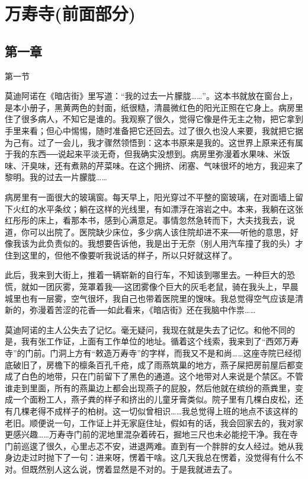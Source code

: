 \chapter{万寿寺(前面部分)}

\section{第一章}

第一节 

莫迪阿诺在《暗店街》里写道：“我的过去一片朦胧……”。这本书就放在窗台上，是本小册子，黑黄两色的封面，纸很糙，清晨微红色的阳光正照在它身上。病房里住了很多病人，不知它是谁的。我观察了很久，觉得它像是件无主之物，把它拿到手里来看；但心中惕惕，随时准备把它还回去。过了很久也没人来要，我就把它据为己有。过了一会儿，我才骤然领悟到：这本书原来是我的。这世界上原来还有属于我的东西──说起来平淡无奇，但我确实没想到。病房里弥漫着水果味、米饭味、汗臭味，还有煮熟的芹菜味。在这个拥挤、闭塞、气味很坏的地方，我迎来了黎明。我的过去一片朦胧…… 

病房里有一面很大的玻璃窗。每天早上，阳光穿过不平整的窗玻璃，在对面墙上留下火红的水平条纹；躺在这样的光线里，有如漂浮在溶岩之中。本来，我躺在这张红彤彤的床上，看那本书，感到心满意足。事情忽然急转而下，大夫找我去，说道，你可以出院了。医院缺少床位，多少病人该住院却进不来──听他的意思，好像我该为此负责似的。我想要告诉他，我是出于无奈（别人用汽车撞了我的头）才住到这里的，但他不像要听我说话的样子，所以只好就这样了。 

此后，我来到大街上，推着一辆崭新的自行车，不知该到哪里去。一种巨大的恐慌，就如一团灰雾，笼罩着我──这团雾像个巨大的灰毛老鼠，骑在我头上，早晨城里也有一层雾，空气很坏，我自己也带着医院里的馊味。我总觉得空气应该是清新的，弥漫着苦涩的花香──如此看来，《暗店街》还在我脑中作祟…… 

莫迪阿诺的主人公失去了记忆。毫无疑问，我现在就是失去了记忆。和他不同的是，我有张工作证，上面有工作单位的地址。循着这个线索，我来到了“西郊万寿寺”的门前。门洞上方有“敕造万寿寺”的字样，而我又不是和尚……这座寺院已经彻底破旧了，房檐下的檩条百孔千疮，成了雨燕筑巢的地方，燕子屎把房前屋后都变成了白色的地带，只在门前留下了黑色的通道。这个地带对人来说是个禁区。不管谁走到里面，所有的燕巢边上都会出现燕子的屁股，然后他就在缤纷的燕粪里，变成一个面粉工人，燕子粪的样子和挤出的儿童牙膏类似。院子里有几棵白皮松，还有几棵老得不成样子的柏树。这一切似曾相识……我总觉得上班的地点不该这样的老旧。顺便说一句，工作证上并无家庭住址，假如有的话，我会回家去的，我对家更感兴趣……万寿寺门前的泥地里混杂着砖石，掘地三尺也未必能挖干净。我在寺门前巡逡了很久，心里忐忑不安，进退两难。直到有一个胖胖的女人经过。她从我身边走过时抛下了一句：进来呀，愣着干啥。这几天我总在愣着，没觉得有什么不对。但既然别人这么说，愣着显然是不对的。于是我就进去了。 

